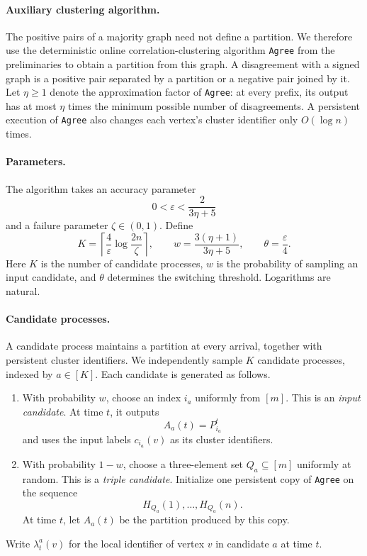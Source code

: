 \documentclass[11pt]{article}
\theoremstyle{definition}
\theoremstyle{remark}
\newcommand{\1}{\mathbf{1}}
\begin{document}
\paragraph{Auxiliary clustering algorithm.}
The positive pairs of a majority graph need not define a partition.
We therefore use the deterministic online correlation-clustering
algorithm \texttt{Agree} from the preliminaries to obtain a partition
from this graph. A disagreement with a signed graph is a positive pair separated by a
partition or a negative pair joined by it. Let $\eta\geq 1$ denote the
approximation factor of \texttt{Agree}: at every prefix, its output has
at most $\eta$ times the minimum possible number of disagreements.
A persistent execution of \texttt{Agree} also changes each vertex's
cluster identifier only $O(\log n)$ times.

\paragraph{Parameters.}
The algorithm takes an accuracy parameter
\[
    0<\varepsilon<\frac{2}{3\eta+5}
\]
and a failure parameter $\zeta\in(0,1)$. Define
\[
    K=
    \left\lceil
        \frac{4}{\varepsilon}\log\frac{2n}{\zeta}
    \right\rceil,
    \qquad
    w=\frac{3(\eta+1)}{3\eta+5},
    \qquad
    \theta=\frac{\varepsilon}{4}.
\]
Here $K$ is the number of candidate processes, $w$ is the probability
of sampling an input candidate, and $\theta$ determines the switching
threshold. Logarithms are natural.

\paragraph{Candidate processes.}
A candidate process maintains a partition at every arrival, together
with persistent cluster identifiers. We independently sample $K$
candidate processes, indexed by $a\in[K]$. Each candidate is generated
as follows.
\begin{enumerate}
    \item With probability $w$, choose an index $i_a$ uniformly from
    $[m]$. This is an \emph{input candidate}. At time $t$, it outputs
    \[
        A_a(t)=P_{i_a}^t
    \]
    and uses the input labels $c_{i_a}(v)$ as its cluster identifiers.

    \item With probability $1-w$, choose a three-element set
    $Q_a\subseteq[m]$ uniformly at random. This is a
    \emph{triple candidate}. Initialize one persistent copy of
    \texttt{Agree} on the sequence
    \[
        H_{Q_a}(1),\ldots,H_{Q_a}(n).
    \]
    At time $t$, let $A_a(t)$ be the partition produced by this copy.
\end{enumerate}
Write $\lambda_t^a(v)$ for the local identifier of vertex $v$ in
candidate $a$ at time $t$.
\end{document}
